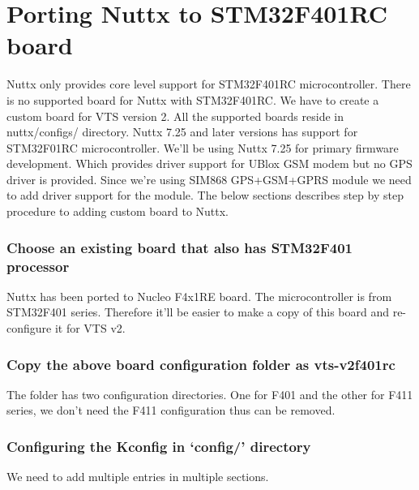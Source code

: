\chapter{Porting Nuttx to STM32F401RC board}

Nuttx only provides core level support for STM32F401RC microcontroller. There is no supported board for Nuttx with STM32F401RC. We have to create a custom board for VTS version 2. All the supported boards reside in nuttx/configs/ directory. Nuttx 7.25 and later versions has support for STM32F01RC microcontroller. We'll be using Nuttx 7.25 for primary firmware development. Which provides driver support for UBlox GSM modem but no GPS driver is provided. Since we're using SIM868 GPS+GSM+GPRS module we need to add driver support for the module. The below sections describes step by step procedure to adding custom board to Nuttx.

\subsection*{Choose an existing board that also has STM32F401 processor}
Nuttx has been ported to Nucleo F4x1RE board. The microcontroller is from STM32F401 series. Therefore it’ll be easier to make a copy of this board and re-configure it for VTS v2.

\subsection*{Copy the above board configuration folder as vts-v2f401rc}
The folder has two configuration directories. One for F401 and the other for F411 series, we don’t need the F411 configuration thus can be removed.

\pagebreak

\subsection*{Configuring the Kconfig in ‘config/' directory}
We need to add multiple entries in multiple sections.

